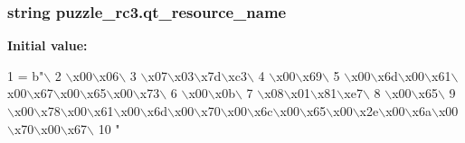 \subsubsection[{qt\+\_\+resource\+\_\+name}]{\setlength{\rightskip}{0pt plus 5cm}string puzzle\+\_\+rc3.\+qt\+\_\+resource\+\_\+name}\label{namespacepuzzle__rc3_a1cb40ea67e87c4c950f11d0723bfb587}
{\bfseries Initial value\+:}
\begin{DoxyCode}
1 = b\textcolor{stringliteral}{"\(\backslash\)}
2 \textcolor{stringliteral}{\(\backslash\)x00\(\backslash\)x06\(\backslash\)}
3 \textcolor{stringliteral}{\(\backslash\)x07\(\backslash\)x03\(\backslash\)x7d\(\backslash\)xc3\(\backslash\)}
4 \textcolor{stringliteral}{\(\backslash\)x00\(\backslash\)x69\(\backslash\)}
5 \textcolor{stringliteral}{\(\backslash\)x00\(\backslash\)x6d\(\backslash\)x00\(\backslash\)x61\(\backslash\)x00\(\backslash\)x67\(\backslash\)x00\(\backslash\)x65\(\backslash\)x00\(\backslash\)x73\(\backslash\)}
6 \textcolor{stringliteral}{\(\backslash\)x00\(\backslash\)x0b\(\backslash\)}
7 \textcolor{stringliteral}{\(\backslash\)x08\(\backslash\)x01\(\backslash\)x81\(\backslash\)xe7\(\backslash\)}
8 \textcolor{stringliteral}{\(\backslash\)x00\(\backslash\)x65\(\backslash\)}
9 \textcolor{stringliteral}{\(\backslash\)x00\(\backslash\)x78\(\backslash\)x00\(\backslash\)x61\(\backslash\)x00\(\backslash\)x6d\(\backslash\)x00\(\backslash\)x70\(\backslash\)x00\(\backslash\)x6c\(\backslash\)x00\(\backslash\)x65\(\backslash\)x00\(\backslash\)x2e\(\backslash\)x00\(\backslash\)x6a\(\backslash\)x00\(\backslash\)x70\(\backslash\)x00\(\backslash\)x67\(\backslash\)}
10 \textcolor{stringliteral}{"}
\end{DoxyCode}
\hypertarget{namespacepuzzle__rc3_ac6cd6e66d0a70a05d96458efeadc6555}{}
